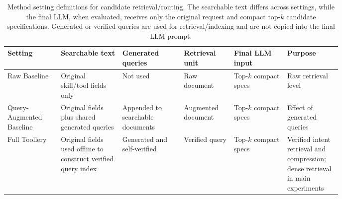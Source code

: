 \documentclass[11pt]{article}
\begin{document}
\begin{table}[t]
\centering
\small
\setlength{\tabcolsep}{3pt}
\begin{tabular}{p{0.13\linewidth}p{0.15\linewidth}p{0.15\linewidth}p{0.11\linewidth}p{0.13\linewidth}p{0.11\linewidth}}
\hline
\textbf{Setting} &
\textbf{Searchable text} &
\textbf{Generated queries} &
\textbf{Retrieval unit} &
\textbf{Final LLM input} &
\textbf{Purpose} \\
\hline
Raw Baseline &
Original skill/tool fields only &
Not used &
Raw document &
Top-$k$ compact specs &
Raw retrieval level \\
Query-Augmented Baseline &
Original fields plus shared generated queries &
Appended to searchable documents &
Augmented document &
Top-$k$ compact specs &
Effect of generated queries \\
Full Toollery &
Original fields used offline to construct verified query index &
Generated and self-verified &
Verified query &
Top-$k$ compact specs &
Verified intent retrieval and compression; dense retrieval in main experiments \\
\hline
\end{tabular}
\caption{Method setting definitions for candidate retrieval/routing. The searchable text differs across settings, while the final LLM, when evaluated, receives only the original request and compact top-$k$ candidate specifications. Generated or verified queries are used for retrieval/indexing and are not copied into the final LLM prompt.}
\label{tab:method-settings}
\end{table}
\end{document}
